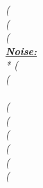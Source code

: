 {{{{\begin{minipage}[t]{0.290\linewidth}
\colorbox{greylight}{
\begin{minipage}[t]{0.975\linewidth}
\textsl{
(%
\hfill 
\\[5mm]
\textsl{
(%
\hfill 
\\[1mm]
\textsl{
(%
\hfill 
\\[5mm]
\underline{\textbf{Noise:}}
\\*
\textsl{
(%
\hfill 
\\[1mm]
\textsl{
(%
\hfill 
\\[3mm]
\textsl{
\hfill 
\\[1mm]
\textsl{
(%
\hfill 
\\[1mm]
\textsl{
(%
\hfill 
\\[1mm]
\textsl{
(%
\hfill 
\\[3mm]
\textsl{
(%
\hfill 
\\[1mm]
\textsl{
(%
\hfill 
\\[1mm]
\textsl{
(%
\hfill 
}}}}}}}}}}}}
\end{minipage}}
\end{minipage}}}}}
